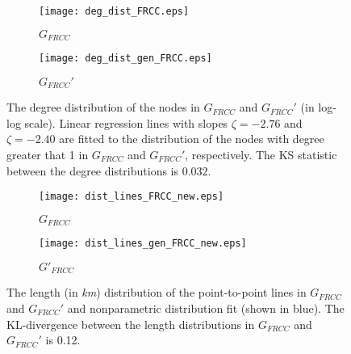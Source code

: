 \documentclass[10pt,journal]{IEEEtran}
\begin{document}
\begin{figure}[t]
\centering
\begin{subfigure}[b]{0.24\textwidth}
\vspace*{-0.2cm}
\texttt{[image: deg\_dist\_FRCC.eps]}
\caption{$G_{FRCC}$}
\vspace*{0.2cm}
\end{subfigure}
\begin{subfigure}[b]{0.24\textwidth}
\vspace*{-0.2cm}
\texttt{[image: deg\_dist\_gen\_FRCC.eps]}
\caption{$G_{FRCC}'$}
\vspace*{0.2cm}
\end{subfigure}
\vspace{-0.6cm}
\caption{The degree distribution of the nodes in $G_{FRCC}$ and $G_{FRCC}'$ (in
log-log scale). Linear regression lines with slopes $\zeta=-2.76$ and $\zeta=-2.40$ are fitted  to
the distribution of the nodes with degree greater that 1 in $G_{FRCC}$ and $G_{FRCC}'$, respectively. The KS statistic between the degree distributions is $0.032$.}
\label{fig:deg_dist_FRCC}
\end{figure}

\begin{figure}[t]
\centering
\begin{subfigure}[b]{0.23\textwidth}
\vspace*{-0.2cm}
\texttt{[image: dist\_lines\_FRCC\_new.eps]}
\caption{$G_{FRCC}$}
\vspace*{0.2cm}
\end{subfigure}
\begin{subfigure}[b]{0.23\textwidth}
\vspace*{-0.2cm}
\texttt{[image: dist\_lines\_gen\_FRCC\_new.eps]}
\caption{$G'_{FRCC}$}
\vspace*{0.2cm}
\end{subfigure}
\vspace{-0.2cm}
\caption{The  length (in \emph{km}) distribution of the point-to-point lines in  $G_{FRCC}$ and $G_{FRCC}'$ and nonparametric distribution fit (shown in blue). The KL-divergence between the length distributions in $G_{FRCC}$ and $G_{FRCC}'$ is 0.12.}
\label{fig:dist_lines_FRCC}
\end{figure}
\end{document}
